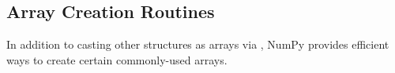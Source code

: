 \subsection*{Array Creation Routines} %

In addition to casting other structures as arrays via , NumPy provides efficient ways to create certain commonly-used arrays.

